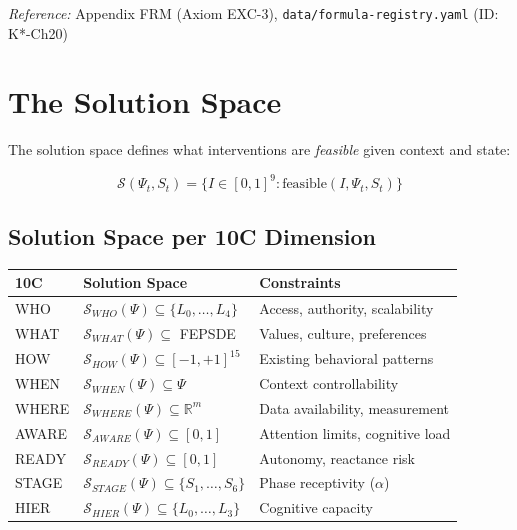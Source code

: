 \textit{Reference:} Appendix FRM (Axiom EXC-3), \texttt{data/formula-registry.yaml} (ID: K*-Ch20)

\section{The Solution Space}
\label{sec:mp-solution-space}

The solution space defines what interventions are \textit{feasible} given context and state:

\begin{equation}
\boxed{
\mathcal{S}(\Psi_t, S_t) = \{I \in [0,1]^9 : \text{feasible}(I, \Psi_t, S_t)\}
}
\label{eq:mp-solution-space}
\end{equation}

\subsection{Solution Space per 10C Dimension}

\begin{center}
\renewcommand{\arraystretch}{1.3}
\begin{tabular}{lll}
\toprule
\textbf{10C} & \textbf{Solution Space} & \textbf{Constraints} \\
\midrule
WHO & $\mathcal{S}_{WHO}(\Psi) \subseteq \{L_0, \ldots, L_4\}$ & Access, authority, scalability \\
WHAT & $\mathcal{S}_{WHAT}(\Psi) \subseteq$ FEPSDE & Values, culture, preferences \\
HOW & $\mathcal{S}_{HOW}(\Psi) \subseteq [-1, +1]^{15}$ & Existing behavioral patterns \\
WHEN & $\mathcal{S}_{WHEN}(\Psi) \subseteq \Psi$ & Context controllability \\
WHERE & $\mathcal{S}_{WHERE}(\Psi) \subseteq \mathbb{R}^m$ & Data availability, measurement \\
AWARE & $\mathcal{S}_{AWARE}(\Psi) \subseteq [0,1]$ & Attention limits, cognitive load \\
READY & $\mathcal{S}_{READY}(\Psi) \subseteq [0,1]$ & Autonomy, reactance risk \\
STAGE & $\mathcal{S}_{STAGE}(\Psi) \subseteq \{S_1, \ldots, S_6\}$ & Phase receptivity ($\alpha$) \\
HIER & $\mathcal{S}_{HIER}(\Psi) \subseteq \{L_0, \ldots, L_3\}$ & Cognitive capacity \\
\bottomrule
\end{tabular}
\end{center}

